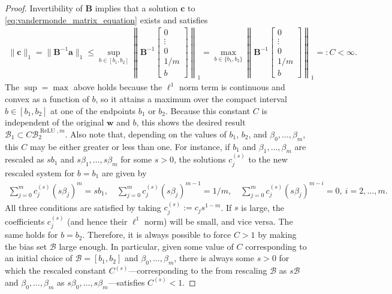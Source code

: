 \documentclass{article}
\DeclareMathOperator{\ReLU}{\mathrm{ReLU}}
\def\va{{\bm{a}}}
\def\vc{{\bm{c}}}
\def\vw{{\bm{w}}}
\def\mB{{\bm{B}}}
\def\cB{{\mathcal{B}}}
\begin{document}
\begin{appendices}
\begin{proof}
    Invertibility of $\mB$ implies that a solution $\vc$ to \eqref{eq:vandermonde_matrix_equation} exists and satisfies
    \begin{align}
        \| \vc \|_1 = \| \mB^{-1} \va \|_1 \leq \sup_{b \in [b_1, b_2]} \left\| \mB^{-1} \begin{bmatrix}
            0 \\ \vdots \\ 0 \\ 1/m \\ b
        \end{bmatrix} \right\|_1 = \max_{b \in \{ b_1, b_2 \}} \left\| \mB^{-1} \begin{bmatrix}
            0 \\ \vdots \\ 0 \\ 1/m \\ b
        \end{bmatrix} \right\|_1  =: C < \infty.
    \end{align}
    The $\sup = \max$ above holds because the $\ell^1$ norm term is continuous and convex as a function of $b$, so it attains a maximum over the compact interval $b \in [b_1, b_2]$ at one of the endpoints $b_1$ or $b_2$. Because this constant $C$ is independent of the original $\vw$ and $b$, this shows the desired result $\cB_1 \subset C \cB_2^{\ReLU,m}$. Also note that, depending on the values of $b_1$, $b_2$, and $\beta_0, \dots, \beta_m$, this $C$ may be either greater or less than one. For instance, if $b_1$ 
    and $\beta_1, \dots, \beta_m$ are rescaled as $sb_1$ and $s \beta_1, \dots, s \beta_m$ for some $s > 0$, the solutions $c_j^{(s)}$ to the new rescaled system for $b = b_1$ are given by
    \begin{align}
        \sum_{j=0}^m c_j^{(s)} (s \beta_j)^{m} = s b_1, \quad  \sum_{j=0}^m c_j^{(s)} (s \beta_j)^{m-1} = 1/m, \quad \sum_{j=0}^m c_j^{(s)} (s \beta_j)^{m-i} = 0, \  i=2, \dots, m.
    \end{align}
    All three conditions are satisfied by taking $c_j^{(s)} := c_j s^{1-m}$. If $s$ is large, the coefficients $c_j^{(s)}$ (and hence their $\ell^1$ norm) will be small, and vice versa. The same holds for $b = b_2$. Therefore, it is always possible to force $C > 1$ by making the bias set $\cB$ large enough. In particular,  given some value of $C$ corresponding to an initial choice of $\cB = [b_1, b_2]$ and $\beta_0, \dots, \beta_m$, there is always some $s > 0$ for which the rescaled constant $C^{(s)}$---corresponding to the from rescaling $\cB$ as $s \cB$ and $\beta_0, \dots, \beta_m$ as $s \beta_0, \dots, s \beta_m$---satisfies $C^{(s)} < 1$.
    

\end{proof}
\end{appendices}
\end{document}
